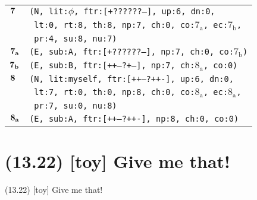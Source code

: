 \documentclass{article}
\begin{document}
\begin{minipage}{\textwidth}
{\begin{tabular}{|r|l|}
    ${\textbf{\textrm{7}}_{\phantom{z}}}$ & \texttt{\texttt{(N,~lit:$\phi$,~ftr:[+??????--],~up:6,~dn:0,}} \\
    & \texttt{\texttt{~lt:0,~rt:8,~th:8,~np:7,~ch:0,~co:${\textrm{7}_{\textrm{a}}}$,~ec:${\textrm{7}_{\textrm{b}}}$,}} \\
    & \texttt{\texttt{~pr:4,~su:8,~nu:7)}} \\
    ${\textbf{\textrm{7}}_{\textbf{\textrm{a}}}}$ & \texttt{\texttt{(E,~sub:A,~ftr:[+??????--],~np:7,~ch:0,~co:${\textrm{7}_{\textrm{b}}}$)}} \\
    ${\textbf{\textrm{7}}_{\textbf{\textrm{b}}}}$ & \texttt{\texttt{(E,~sub:B,~ftr:[++---?+--],~np:7,~ch:${\textrm{8}_{\textrm{a}}}$,~co:0)}} \\
    ${\textbf{\textrm{8}}_{\phantom{z}}}$ & \texttt{\texttt{(N,~lit:myself,~ftr:[++---?++-],~up:6,~dn:0,}} \\
    & \texttt{\texttt{~lt:7,~rt:0,~th:0,~np:8,~ch:0,~co:${\textrm{8}_{\textrm{a}}}$,~ec:${\textrm{8}_{\textrm{a}}}$,}} \\
    & \texttt{\texttt{~pr:7,~su:0,~nu:8)}} \\
    ${\textbf{\textrm{8}}_{\textbf{\textrm{a}}}}$ & \texttt{\texttt{(E,~sub:A,~ftr:[++---?++-],~np:8,~ch:0,~co:0)}} \\
    \hline
  \end{tabular}
  }
\end{minipage}
\bigbreak

\clearpage

%
%

\section*{(13.22) [toy] Give me that!}

\bigbreak
\begin{enumerate*}
\item[(13.22)] [toy] Give me that!
\end{enumerate*}
\bigbreak
\end{document}
